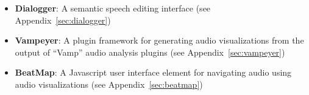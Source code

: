 \begin{itemize}
  \item \textbf{Dialogger}: A semantic speech editing interface (see Appendix~\ref{sec:dialogger})
  \item \textbf{Vampeyer}: A plugin framework for generating audio visualizations from the output of ``Vamp'' audio
    analysis plugins (see Appendix~\ref{sec:vampeyer})
  \item \textbf{BeatMap}: A Javascript user interface element for navigating audio using audio visualizations
    (see Appendix~\ref{sec:beatmap})
\end{itemize}

